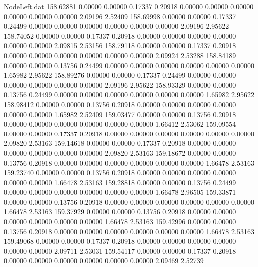 \begin{filecontents}{NodeLeft.dat}
 158.62881    0.00000    0.00000     0.17337    0.20918    0.00000    0.00000    0.00000    0.00000    0.00000    0.00000    2.09196    2.52409
 158.69998    0.00000    0.00000     0.17337    0.24499    0.00000    0.00000    0.00000    0.00000    0.00000    0.00000    2.09196    2.95622
 158.74052    0.00000    0.00000     0.17337    0.20918    0.00000    0.00000    0.00000    0.00000    0.00000    0.00000    2.09815    2.53156
 158.79118    0.00000    0.00000     0.17337    0.20918    0.00000    0.00000    0.00000    0.00000    0.00000    0.00000    2.09924    2.53288
 158.84189    0.00000    0.00000     0.13756    0.24499    0.00000    0.00000    0.00000    0.00000    0.00000    0.00000    1.65982    2.95622
 158.89276    0.00000    0.00000     0.17337    0.24499    0.00000    0.00000    0.00000    0.00000    0.00000    0.00000    2.09196    2.95622
 158.93329    0.00000    0.00000     0.13756    0.24499    0.00000    0.00000    0.00000    0.00000    0.00000    0.00000    1.65982    2.95622
 158.98412    0.00000    0.00000     0.13756    0.20918    0.00000    0.00000    0.00000    0.00000    0.00000    0.00000    1.65982    2.52409
 159.03477    0.00000    0.00000     0.13756    0.20918    0.00000    0.00000    0.00000    0.00000    0.00000    0.00000    1.66412    2.53062
 159.09554    0.00000    0.00000     0.17337    0.20918    0.00000    0.00000    0.00000    0.00000    0.00000    0.00000    2.09820    2.53163
 159.14618    0.00000    0.00000     0.17337    0.20918    0.00000    0.00000    0.00000    0.00000    0.00000    0.00000    2.09820    2.53163
 159.18672    0.00000    0.00000     0.13756    0.20918    0.00000    0.00000    0.00000    0.00000    0.00000    0.00000    1.66478    2.53163
 159.23740    0.00000    0.00000     0.13756    0.20918    0.00000    0.00000    0.00000    0.00000    0.00000    0.00000    1.66478    2.53163
 159.28818    0.00000    0.00000     0.13756    0.24499    0.00000    0.00000    0.00000    0.00000    0.00000    0.00000    1.66478    2.96505
 159.33871    0.00000    0.00000     0.13756    0.20918    0.00000    0.00000    0.00000    0.00000    0.00000    0.00000    1.66478    2.53163
 159.37929    0.00000    0.00000     0.13756    0.20918    0.00000    0.00000    0.00000    0.00000    0.00000    0.00000    1.66478    2.53163
 159.42996    0.00000    0.00000     0.13756    0.20918    0.00000    0.00000    0.00000    0.00000    0.00000    0.00000    1.66478    2.53163
 159.49068    0.00000    0.00000     0.17337    0.20918    0.00000    0.00000    0.00000    0.00000    0.00000    0.00000    2.09711    2.53031
 159.54117    0.00000    0.00000     0.17337    0.20918    0.00000    0.00000    0.00000    0.00000    0.00000    0.00000    2.09469    2.52739

\end{filecontents}
